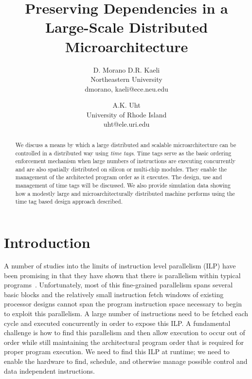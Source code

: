 \documentclass[10pt,twocolumn,dvips]{article}
\begin{document}
\parskip 1mm
%
%
\title{Preserving Dependencies in a Large-Scale Distributed 
Microarchitecture}
%
\author{
D. Morano  D.R. Kaeli\\
Northeastern University\\
dmorano, kaeli@ece.neu.edu\\
\and
A.K. Uht \\
University of Rhode Island\\ uht@ele.uri.edu
}
%
\date{ }
\maketitle
\date{ }
\thispagestyle{empty}
%
\begin{abstract}
\footnotesize{
We discuss a means by which a large distributed and scalable
microarchitecture can be controlled in a distributed way using
{\em time tags}.  Time tags serve as the basic ordering enforcement mechanism
when large numbers of instructions are executing concurrently and
are also spatially distributed on silicon or multi-chip modules.
They enable the management of the architected program order as
it executes.  The design, use and management of time tags will
be discussed.  We also provide simulation data showing how a modestly large
and microarchitecturally distributed machine performs using
the time tag based design approach described.
}
\end{abstract}
%
\vspace{-0.2in}
\section{Introduction}
\vspace{-0.1in}
A number of studies into the limits of instruction level parallelism (ILP) have
been promising in that they have shown that there is parallelism within
typical programs~\cite{Gon97,Lam92,Uht95}.  
Unfortunately, most of this fine-grained
parallelism spans several basic blocks and the relatively small
instruction fetch windows of existing processor designs cannot span
the program instruction space necessary to begin to exploit this
parallelism.  A large number of instructions need to be fetched
each cycle and executed concurrently in order to expose this ILP.
A fundamental challenge 
is how to find this parallelism and then allow execution to occur
out of order  
while still maintaining the architectural program order that
is required for proper program execution.
We need to find this ILP at runtime; we need to 
enable the hardware to find, schedule,
and otherwise manage possible control and data independent instructions.
\end{document}
